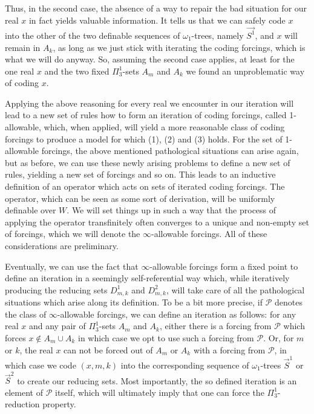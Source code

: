 \documentclass[a4paper,11pt]{article}
\begin{document}
Thus, in the second case, the absence of a way to repair the bad situation for our real $x$ in fact yields valuable information. It tells us that we can safely code $x$ into the other of the two definable sequences of $\omega_1$-trees, namely $\vec{S^1}$, and $x$ will remain in $A_k$, as long as we just stick with iterating the coding forcings, which is what we will do anyway. So, assuming the second case applies, at least for the one real $x$ and the two fixed $\Pi^1_3$-sets $A_m$ and $A_k$ we found an unproblematic way of coding $x$.


Applying the above reasoning for every real we encounter in our iteration will lead to a new set of rules how to form an iteration of coding forcings, called 1-allowable, which, when applied, will yield a more reasonable class of coding forcings to produce a model for which (1), (2)  and (3) holds. For the set of 1-allowable forcings, the above mentioned pathological situations can arise again, but as before, we can use these newly arising problems to define a new set of rules, yielding a new set of forcings and so on. This leads to an inductive definition of an operator which acts on sets of iterated coding forcings. The operator, which can be seen as some sort of derivation, will be uniformly definable over $W$.
We will set things up in such a way that the process of applying the operator transfinitely often converges to a unique and non-empty set of forcings, which we will denote the $\infty$-allowable forcings. All of these considerations are preliminary. 

Eventually,  we can use the fact that $\infty$-allowable forcings form a fixed point to define an iteration in a seemingly self-referential way which, while iteratively producing the reducing sets $D ^1_{m,k}$ and $D^2_{m,k}$, will take care of all the pathological situations which arise along its definition.  
To be a bit more precise, if $\mathcal{P}$ denotes the class of $\infty$-allowable forcings, we can define an iteration as follows:  for any real $x$ and any pair of $\Pi^1_3$-sets $A_m$ and $A_k$, either there is a forcing from $\mathcal{P}$ which forces $x \notin A_m \cup A_k$ in which case we opt to use such a forcing from $\mathcal{P}$. Or, for $m$ or $k$, the real $x$ can not be forced out of $A_m$ or $A_k$ with a forcing from $\mathcal{P}$, in which case we code $(x,m,k)$ into the corresponding sequence of $\omega_1$-trees $\vec{S}^1$ or $\vec{S}^2$ to create our reducing sets. Most importantly, the so defined iteration is an element of $\mathcal{P}$ itself, which will ultimately imply that one can force  the $\Pi^1_3$-reduction property. 
\end{document}

